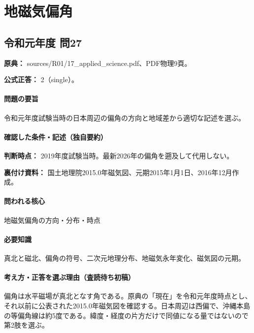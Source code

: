 \section{地磁気偏角}

\subsection{令和元年度 問27}
\label{q:r01-reg-applied-27}

\noindent\textbf{原典：} sources/R01/17\_applied\_science.pdf、PDF物理9頁。

\textbf{公式正答：} 2（single）。

\paragraph{問題の要旨} 令和元年度試験当時の日本周辺の偏角の方向と地域差から適切な記述を選ぶ。

\paragraph{確認した条件・記述（独自要約）}\mbox{}\par

\noindent\textbf{判断時点：} 2019年度試験当時。最新2026年の偏角を遡及して代用しない。\par

\noindent\textbf{裏付け資料：} 国土地理院2015.0年磁気図、元期2015年1月1日、2016年12月作成。\par

\paragraph{問われる核心} 地磁気偏角の方向・分布・時点

\paragraph{必要知識} 真北と磁北、偏角の符号、二次元地理分布、地磁気永年変化、磁気図の元期。

\paragraph{考え方・正答を選ぶ理由（査読待ち初稿）} 偏角は水平磁場が真北となす角である。原典の「現在」を令和元年度時点とし、それ以前に公表された2015.0年磁気図を確認する。日本周辺は西偏で、沖縄本島の等偏角線は約5度である。緯度・経度の片方だけで同値になる量ではないので第2肢を選ぶ。

